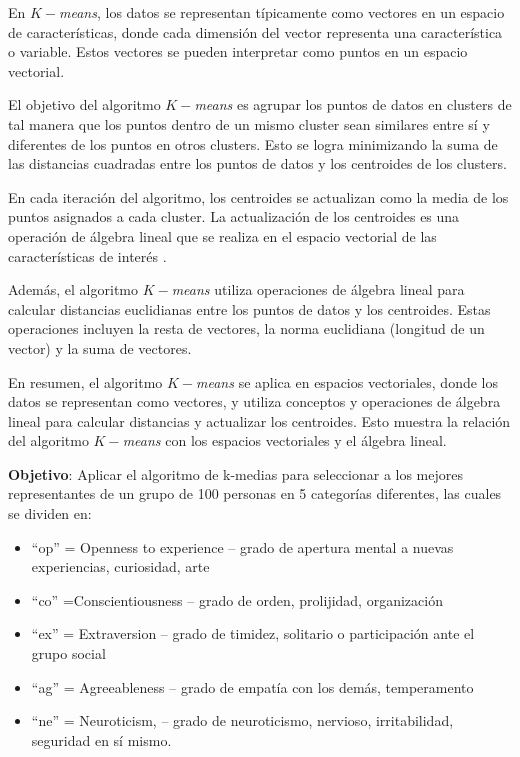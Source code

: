 \documentclass[12pt]{article}
\theoremstyle{exampstyle}
\theoremstyle{definition}
\theoremstyle{break}
\numberwithin{equation}{section}
\begin{document}
En $K-$\emph{means}, los datos se representan típicamente como vectores en un espacio de características, donde cada dimensión del vector representa una característica o variable. Estos vectores se pueden interpretar como puntos en un espacio vectorial.

El objetivo del algoritmo $K-$\emph{means} es agrupar los puntos de datos en clusters de tal manera que los puntos dentro de un mismo cluster sean similares entre sí y diferentes de los puntos en otros clusters. Esto se logra minimizando la suma de las distancias cuadradas entre los puntos de datos y los centroides de los clusters.

En cada iteración del algoritmo, los centroides se actualizan como la media de los puntos asignados a cada cluster. La actualización de los centroides es una operación de álgebra lineal que se realiza en el espacio vectorial de las características de interés .

Además, el algoritmo $K-$\emph{means} utiliza operaciones de álgebra lineal para calcular distancias euclidianas entre los puntos de datos y los centroides. Estas operaciones incluyen la resta de vectores, la norma euclidiana (longitud de un vector) y la suma de vectores.

En resumen, el algoritmo $K-$\emph{means} se aplica en espacios vectoriales, donde los datos se representan como vectores, y utiliza conceptos y operaciones de álgebra lineal para calcular distancias y actualizar los centroides. Esto muestra la relación del algoritmo $K-$\emph{means} con los espacios vectoriales y el álgebra lineal.
\newline


{\bf Objetivo}: Aplicar el algoritmo de k-medias para seleccionar a los mejores representantes de un grupo de 100 personas en 5 categorías diferentes, las cuales se dividen en:
\begin{itemize}
    \item “op” = Openness to experience – grado de apertura mental a nuevas experiencias, curiosidad,
arte
    \item “co” =Conscientiousness – grado de orden, prolijidad, organización
    \item “ex” = Extraversion – grado de timidez, solitario o participación ante el grupo social
    \item “ag” = Agreeableness – grado de empatía con los demás, temperamento
    \item “ne” = Neuroticism, – grado de neuroticismo, nervioso, irritabilidad, seguridad en sí mismo.

\end{itemize}
\end{document}
